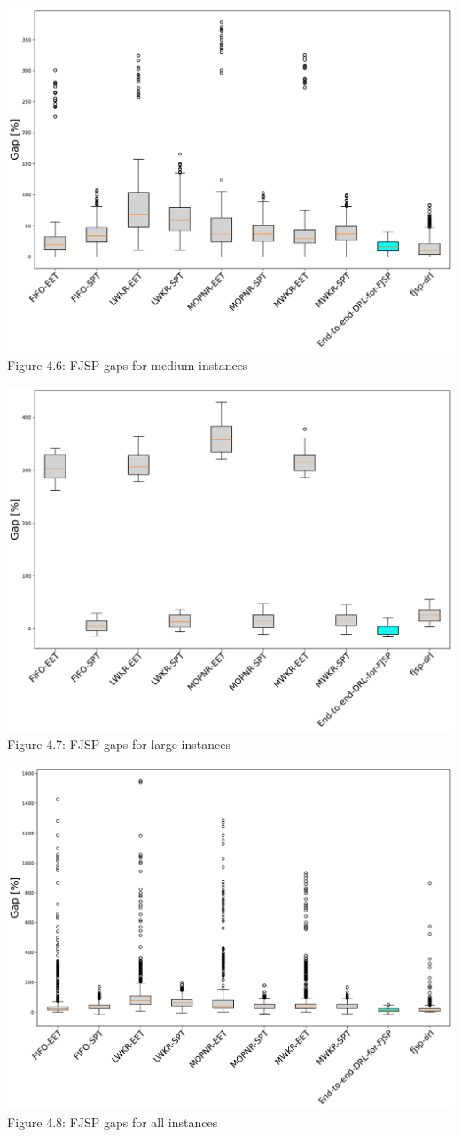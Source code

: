 \begin{center}
    \includegraphics[width=0.8\linewidth]{images/horizontal_boxplot_fjsp_medium.pdf}\\
    Figure 4.6: FJSP gaps for medium instances
\end{center}
\begin{center}
    \includegraphics[width=0.8\linewidth]{images/horizontal_boxplot_fjsp_large.pdf}\\
    Figure 4.7: FJSP gaps for large instances
\end{center}
\begin{center}
    \includegraphics[width=0.8\linewidth]{images/horizontal_boxplot_fjsp_all.pdf}\\
    Figure 4.8: FJSP gaps for all instances
\end{center}

